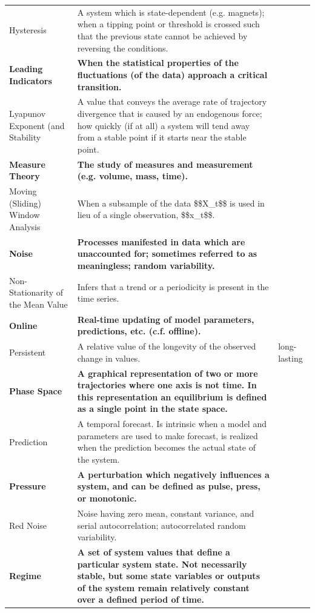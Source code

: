 \documentclass[12pt,twoside,openany]{reedthesis}
\begin{document}
\begin{landscape}
\begin{longtable}{>{\raggedright\arraybackslash}p{12em}>{\raggedright\arraybackslash}p{35em}>{\raggedright\arraybackslash}p{8em}}
Hysteresis & A system which is state-dependent (e.g. magnets); when a tipping point or threshold is crossed such that the previous state cannot be achieved by reversing the conditions. & \\
\textbf{Leading Indicators} & \textbf{When the statistical properties of the fluctuations (of the data) approach a critical transition.} & \textbf{}\\
Lyapunov Exponent (and Stability & A value that conveys the average rate of trajectory divergence that is caused by an endogenous force; how quickly (if at all) a system will tend away from a stable point if it starts near the stable point. & \\
\addlinespace
\textbf{Measure Theory} & \textbf{The study of measures and measurement (e.g. volume, mass, time).} & \textbf{}\\
Moving (Sliding) Window Analysis & When a subsample of the data \$\$X\_t\$\$ is used in lieu of a single observation, \$\$x\_t\$\$. & \\
\textbf{Noise} & \textbf{Processes manifested in data which are unaccounted for; sometimes referred to as meaningless; random variability.} & \textbf{}\\
Non-Stationarity of the Mean Value & Infers that a trend or a periodicity is present in the time series. & \\
\textbf{Online} & \textbf{Real-time updating of model parameters, predictions, etc. (c.f. offline).} & \textbf{}\\
\addlinespace
Persistent & A relative value of the longevity of the observed change in values. & long-lasting\\
\textbf{Phase Space} & \textbf{A graphical representation of two or more trajectories where one axis is not time. In this representation an equilibrium is defined as a single point in the state space.} & \textbf{}\\
Prediction & A temporal forecast. Is intrinsic when a model and parameters are used to make forecast, is realized when the prediction becomes the actual state of the system. & \\
\textbf{Pressure} & \textbf{A perturbation which negatively influences a system, and can be defined as pulse, press, or monotonic.} & \textbf{}\\
Red Noise & Noise having zero mean, constant variance, and serial autocorrelation; autocorrelated random variability. & \\
\addlinespace
\textbf{Regime} & \textbf{A set of system values that define a particular system state. Not necessarily stable, but some state variables or outputs of the system remain relatively constant over a defined period of time.} & \textbf{}\\

\end{longtable}
\end{landscape}
\end{document}
